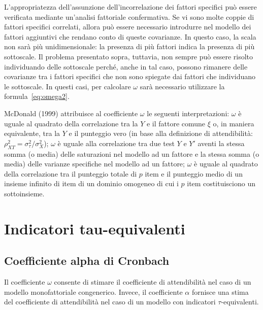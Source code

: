L'appropriatezza dell'assunzione dell'incorrelazione dei fattori
   specifici può essere verificata mediante un'analisi fattoriale
   confermativa.
  Se vi sono molte coppie di fattori specifici correlati, allora
   può essere necessario introdurre nel modello dei fattori aggiuntivi
   che rendano conto di queste covarianze. 
   In questo caso,  la scala non sarà più unidimensionale: la
   presenza di più fattori  indica la presenza di più sottoscale. 
Il problema presentato sopra, tuttavia, non sempre può essere
   risolto individuando delle sottoscale perché, anche in tal caso,
   possono rimanere delle covarianze tra i fattori specifici che non
   sono spiegate dai fattori che individuano le sottoscale. 
   In questi casi, per calcolare $\omega$ sarà necessario utilizzare la formula~\ref{eq:omega2}.

McDonald (1999) attribuisce al coefficiente $\omega$ le seguenti interpretazioni: 
$\omega$ è uguale al quadrato della correlazione tra la $Y$ e il
  fattore comune $\xi$ o, in maniera equivalente, tra la $Y$ e il
  punteggio vero (in base alla definizione di attendibilità: $\rho_{XT}^2=\sigma^2_{\tau}/\sigma^2_X$);
 $\omega$ è uguale  alla correlazione tra due test $Y$ e $Y'$ aventi la stessa somma (o media) delle saturazioni nel modello ad un fattore e la stessa somma (o media) delle varianze specifiche nel modello ad un fattore;
 $\omega$ è uguale al quadrato della correlazione tra il punteggio totale di $p$ item e il punteggio medio di un insieme infinito di item di un dominio omogeneo di cui i $p$ item costituisciono un sottoinsieme.

\section{Indicatori tau-equivalenti}

\subsection{Coefficiente alpha di Cronbach}

Il coefficiente $\omega$ consente di stimare il coefficiente di attendibilità nel caso di un modello monofattoriale congenerico.
Invece, il coefficiente $\alpha$ fornisce una stima del coefficiente di attendibilità nel caso di un modello con indicatori $\tau$-equivalenti.
  
